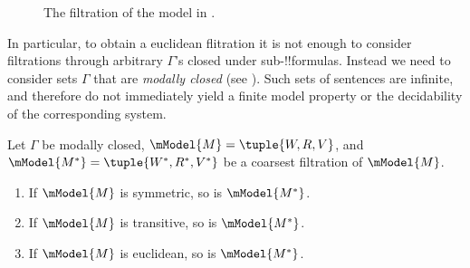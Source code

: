\documentclass[../../../include/open-logic-section]{subfiles}
\begin{document}
\begin{figure}[ht]
  \centering
  \caption{The filtration of the model in .}
\end{figure}

In particular, to obtain a euclidean flitration it is not enough to
consider filtrations through arbitrary $\Gamma$'s closed under
sub-!!{formula}s. Instead we need to consider sets $\Gamma$ that are
\emph{modally closed} (see ). Such sets
of sentences are infinite, and therefore do not immediately yield a
finite model property or the decidability of the corresponding system.

\begin{thm}
  Let $\Gamma$ be modally closed, $\mModel{M}=\tuple{W,R,V}$, and
  $\mModel{M^*} = \tuple{W^*,R^*,V^*}$ be a coarsest filtration of
  $\mModel{M}$.
  \begin{enumerate}
  \item If $\mModel{M}$ is symmetric, so is $\mModel{M^*}$.
  \item If $\mModel{M}$ is transitive, so is $\mModel{M^*}$.
  \item If $\mModel{M}$ is euclidean, so is $\mModel{M^*}$.
  \end{enumerate}
\end{thm}
\end{document}
